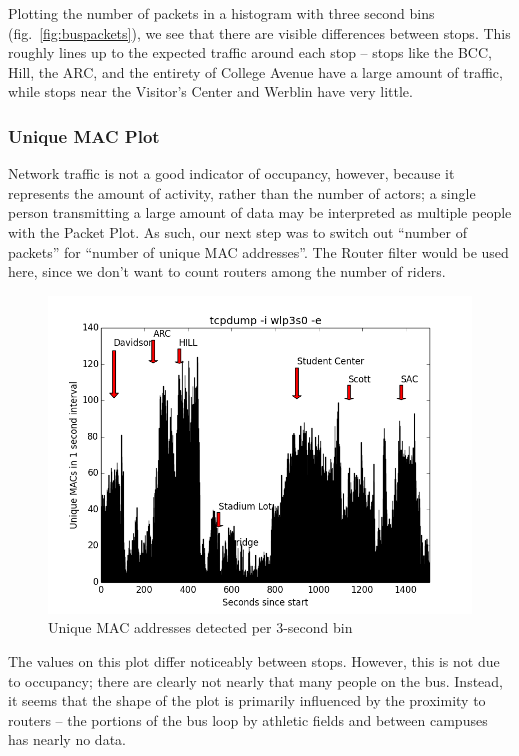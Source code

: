 \documentclass[11pt,journal,compsoc]{IEEEtran} %
\begin{document}
		Plotting the number of packets in a histogram with three second bins (fig.~\ref{fig:buspackets}), we see that there are visible differences between stops.
		This roughly lines up to the expected traffic around each stop -- stops like the BCC, Hill, the ARC, and the entirety of College Avenue have a large amount of traffic, while stops near the Visitor's Center and Werblin have very little.

	\subsubsection*{Unique MAC Plot}

		Network traffic is not a good indicator of occupancy, however, because it represents the amount of activity, rather than the number of actors; a single person transmitting a large amount of data may be interpreted as multiple people with the Packet Plot.
		As such, our next step was to switch out ``number of packets'' for ``number of unique MAC addresses''.
		The Router filter would be used here, since we don't want to count routers among the number of riders.

		\begin{figure}[!t]
		  \includegraphics[width=\textwidth]{unique}
          \caption{Unique MAC addresses detected per 3-second bin}
          \label{fig:busunique}
		\end{figure}

		The values on this plot differ noticeably between stops.
		However, this is not due to occupancy; there are clearly not nearly that many people on the bus.
		Instead, it seems that the shape of the plot is primarily influenced by the proximity to routers -- the portions of the bus loop by athletic fields and between campuses has nearly no data.
\end{document}
